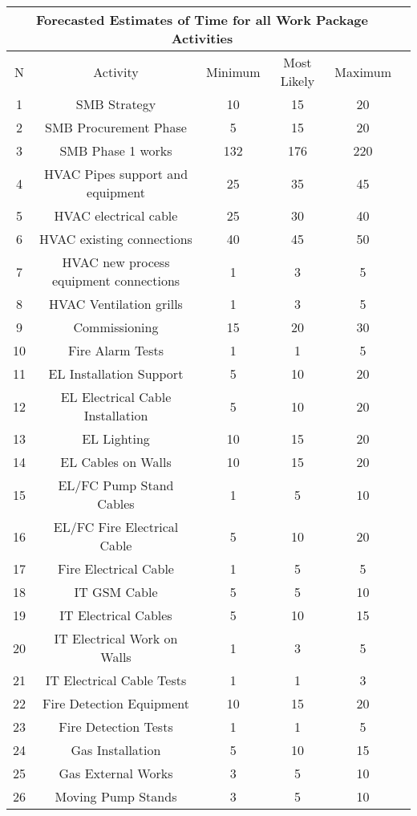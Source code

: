 \begin{table}[ht]
\begin{center}
	\begin{tabular}{ |c|c|c|c|c| c|} 
		\hline
		\multicolumn{5}{|c|}{Forecasted Estimates of Time for all Work Package Activities} \\
		\hline
		N&Activity & Minimum & Most Likely & Maximum\\
		\hline
		1&SMB Strategy &10 &  15& 20\\ 
		\hline
		2&SMB Procurement Phase &5 &15 &20\\ 
		\hline
		3&SMB Phase 1 works&132 &176 &220\\ 
		\hline
		4&HVAC Pipes support and equipment &25&35&45\\
		\hline
		5&HVAC electrical cable&25&30&40\\
		\hline
		6&HVAC existing connections&40&45&50\\
		\hline
		7&HVAC new process equipment connections&1&3&5\\
		\hline
		8&HVAC Ventilation grills&1&3&5\\
		\hline
		9&Commissioning&15&20&30\\
		\hline
		10&Fire Alarm Tests&1&1&5\\
		\hline
		11&EL Installation Support&5&10&20\\
		\hline
		12&EL Electrical Cable Installation &5&10&20\\
		\hline
		13&EL Lighting&10&15&20\\
		\hline
		14&EL Cables on Walls&10&15&20\\
		\hline
		15&EL/FC Pump Stand Cables&1&5&10\\
		\hline
		16&EL/FC Fire Electrical Cable&5&10&20\\
		\hline
		17&Fire Electrical Cable&1&5&5\\
		\hline
		18&IT GSM Cable&5&5&10\\
		\hline
		19&IT Electrical Cables&5&10&15\\
		\hline
		20&IT Electrical Work on Walls&1&3&5\\
		\hline
		21&IT Electrical Cable Tests &1&1&3\\
		\hline
		22&Fire Detection Equipment&10&15&20\\
		\hline
		23&Fire Detection Tests&1&1&5\\
		\hline
		24&Gas Installation&5&10&15\\
		\hline
		25&Gas External Works&3&5&10\\
		\hline
		26&Moving Pump Stands&3&5&10\\

\end{tabular}
\end{center}
\end{table}
